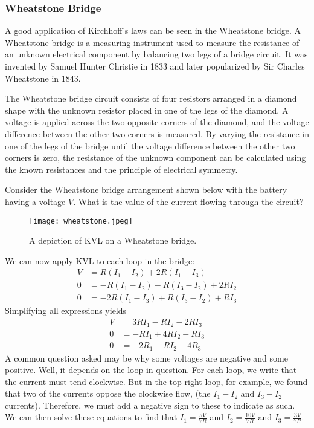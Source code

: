 \documentclass[12pt]{article}
\begin{document}
\subsubsection{Wheatstone Bridge}
A good application of Kirchhoff's laws can be seen in the Wheatstone bridge. A Wheatstone bridge is a measuring instrument used to measure the resistance of an unknown electrical component by balancing two legs of a bridge circuit. It was invented by Samuel Hunter Christie in 1833 and later popularized by Sir Charles Wheatstone in 1843.

The Wheatstone bridge circuit consists of four resistors arranged in a diamond shape with the unknown resistor placed in one of the legs of the diamond. A voltage is applied across the two opposite corners of the diamond, and the voltage difference between the other two corners is measured. By varying the resistance in one of the legs of the bridge until the voltage difference between the other two corners is zero, the resistance of the unknown component can be calculated using the known resistances and the principle of electrical symmetry.
\begin{prob}
Consider the Wheatstone bridge arrangement shown below with the battery having a voltage $V$. What is the value of the current flowing through the circuit?
\end{prob}
    \begin{figure}[H]
  \centering
      \texttt{[image: wheatstone.jpeg]}
      \caption{A depiction of KVL on a Wheatstone bridge.}
  \end{figure}
  We can now apply KVL to each loop in the bridge:
  \begin{align*}
      V &= R(I_1 - I_2) + 2R (I_1 - I_3) \\
      0 &= -R(I_1 - I_2) - R (I_3 - I_2) + 2R I_2 \\
      0 &= -2R (I_1 - I_3) + R(I_3 - I_2) + RI_3
  \end{align*} 
  Simplifying all expressions yields
  \begin{align*}
      V &=  3RI_1 - R I_2 - 2R I_3 \\
      0 &= - RI_1 + 4RI_2 - RI_3 \\
      0 &= - 2R_1 - RI_2 + 4R_3
  \end{align*}
  A common question asked may be why some voltages are negative and some positive. Well, it depends on the loop in question. For each loop, we write that the current must tend clockwise. But in the top right loop, for example, we found that two of the currents oppose the clockwise flow, (the $I_1 - I_2$ and $I_3 - I_2$ currents). Therefore, we must add a negative sign to these to indicate as such. We can then solve these equations to find that $I_1 = \frac{5V}{7R}$ and $I_2 = \frac{10V}{7R}$ and $I_3 = \frac{3V}{7R}$.
\end{document}
